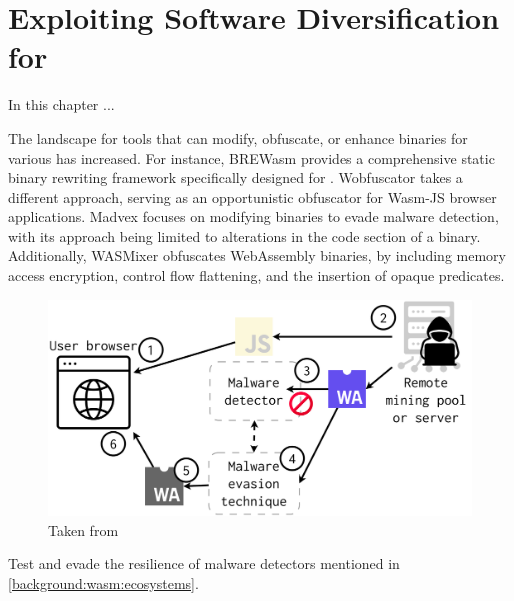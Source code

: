 \chapter{Exploiting Software Diversification for \Wasm}
\label{exploit}

In this chapter ... 



 The landscape for tools that can modify, obfuscate, or enhance \Wasm binaries for various has increased. 
For instance, BREWasm\cite{BREWasm} provides a comprehensive static binary rewriting framework specifically designed for \Wasm. 
Wobfuscator\cite{wobfuscator} takes a different approach, serving as an opportunistic obfuscator for Wasm-JS browser applications. 
Madvex\cite{madvex} focuses on modifying \Wasm binaries to evade malware detection, with its approach being limited to alterations in the code section of a \Wasm binary. 
Additionally, WASMixer\cite{wasmixer} obfuscates WebAssembly binaries, by including memory access encryption, control flow flattening, and the insertion of opaque predicates.




\begin{figure}
    \centering
    \includegraphics[width=0.8\linewidth]{figures/threat_model.pdf}
    \caption{Taken from \cite{EVASION}}
    \label{fig:threat_model}
\end{figure}

Test and evade the resilience of \Wasm malware detectors mentioned in \autoref{background:wasm:ecosystems}.





